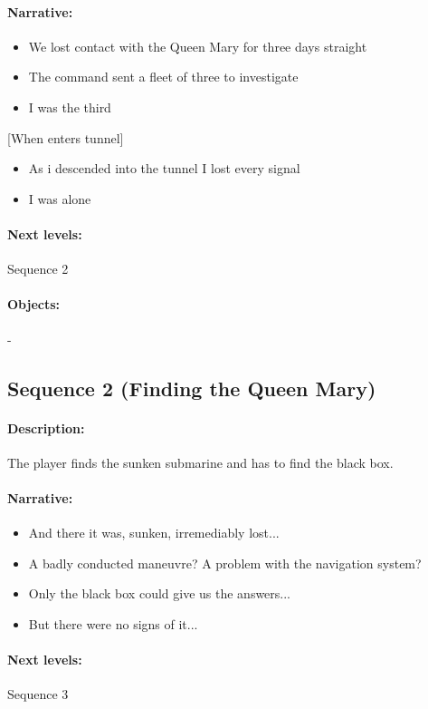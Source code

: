 \documentclass{article}
\begin{document}
\paragraph{Narrative: } 
\begin{itemize}
\item We lost contact with the Queen Mary for three days straight
\item The command sent a fleet of three to investigate
\item I was the third
\end{itemize}
[When enters tunnel]
\begin{itemize}
\item As i descended into the tunnel I lost every signal
\item I was alone
\end{itemize}
\paragraph{Next levels: } Sequence 2
\paragraph{Objects: } -

\subsection{Sequence 2 (Finding the Queen Mary)}

\paragraph{Description: } The player finds the sunken submarine and has to find the black box.
\paragraph{Narrative: } 
\begin{itemize}
\item And there it was, sunken, irremediably lost...
\item A badly conducted maneuvre? A problem with the navigation system?
\item Only the black box could give us the answers...
\item But there were no signs of it...
\end{itemize}
\paragraph{Next levels: } Sequence 3
\end{document}
